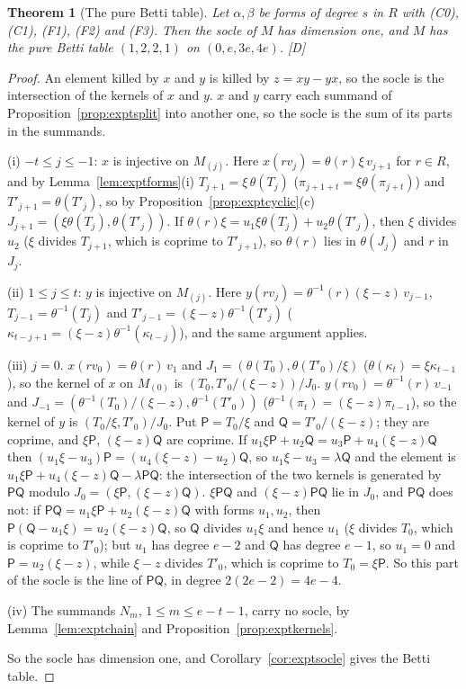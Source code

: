 \documentclass[11pt]{article}
\newtheorem{thmletter}{Theorem}
\theoremstyle{definition}
\theoremstyle{remark}
\begin{document}
\begin{thmletter}[The pure Betti table]\label{thm:exptpure}
Let $\alpha,\beta$ be forms of degree $s$ in $R$ with (C0), (C1), (F1), (F2) and (F3). Then the socle of $M$ has dimension one, and $M$ has the pure Betti table $(1,2,2,1)$ on $(0,e,3e,4e)$. [D]
\end{thmletter}
\begin{proof}
An element killed by $x$ and $y$ is killed by $z=xy-yx$, so the socle is the intersection of the kernels of $x$ and $y$. $x$ and $y$ carry each summand of Proposition~\ref{prop:exptsplit} into another one, so the socle is the sum of its parts in the summands.

(i) $-t\le j\le-1$: $x$ is injective on $M_{(j)}$. Here $x(rv_j)=\theta(r)\xi\,v_{j+1}$ for $r\in R$, and by Lemma~\ref{lem:exptforms}(i) $T_{j+1}=\xi\,\theta(T_j)$ ($\pi_{j+1+t}=\xi\theta(\pi_{j+t})$) and $T'_{j+1}=\theta(T'_j)$, so by Proposition~\ref{prop:exptcyclic}(c) $J_{j+1}=(\xi\theta(T_j),\theta(T'_j))$. If $\theta(r)\xi=u_1\xi\theta(T_j)+u_2\theta(T'_j)$, then $\xi$ divides $u_2$ ($\xi$ divides $T_{j+1}$, which is coprime to $T'_{j+1}$), so $\theta(r)$ lies in $\theta(J_j)$ and $r$ in $J_j$.

(ii) $1\le j\le t$: $y$ is injective on $M_{(j)}$. Here $y(rv_j)=\theta^{-1}(r)(\xi-z)\,v_{j-1}$, $T_{j-1}=\theta^{-1}(T_j)$ and $T'_{j-1}=(\xi-z)\theta^{-1}(T'_j)$ ($\kappa_{t-j+1}=(\xi-z)\theta^{-1}(\kappa_{t-j})$), and the same argument applies.

(iii) $j=0$. $x(rv_0)=\theta(r)\,v_1$ and $J_1=(\theta(T_0),\theta(T'_0)/\xi)$ ($\theta(\kappa_t)=\xi\kappa_{t-1}$), so the kernel of $x$ on $M_{(0)}$ is $(T_0,T'_0/(\xi-z))/J_0$. $y(rv_0)=\theta^{-1}(r)\,v_{-1}$ and $J_{-1}=(\theta^{-1}(T_0)/(\xi-z),\theta^{-1}(T'_0))$ ($\theta^{-1}(\pi_t)=(\xi-z)\pi_{t-1}$), so the kernel of $y$ is $(T_0/\xi,T'_0)/J_0$. Put $\mathsf P=T_0/\xi$ and $\mathsf Q=T'_0/(\xi-z)$; they are coprime, and $\xi\mathsf P$, $(\xi-z)\mathsf Q$ are coprime. If $u_1\xi\mathsf P+u_2\mathsf Q=u_3\mathsf P+u_4(\xi-z)\mathsf Q$ then $(u_1\xi-u_3)\mathsf P=(u_4(\xi-z)-u_2)\mathsf Q$, so $u_1\xi-u_3=\lambda\mathsf Q$ and the element is $u_1\xi\mathsf P+u_4(\xi-z)\mathsf Q-\lambda\mathsf P\mathsf Q$: the intersection of the two kernels is generated by $\mathsf P\mathsf Q$ modulo $J_0=(\xi\mathsf P,(\xi-z)\mathsf Q)$. $\xi\mathsf P\mathsf Q$ and $(\xi-z)\mathsf P\mathsf Q$ lie in $J_0$, and $\mathsf P\mathsf Q$ does not: if $\mathsf P\mathsf Q=u_1\xi\mathsf P+u_2(\xi-z)\mathsf Q$ with forms $u_1,u_2$, then $\mathsf P(\mathsf Q-u_1\xi)=u_2(\xi-z)\mathsf Q$, so $\mathsf Q$ divides $u_1\xi$ and hence $u_1$ ($\xi$ divides $T_0$, which is coprime to $T'_0$); but $u_1$ has degree $e-2$ and $\mathsf Q$ has degree $e-1$, so $u_1=0$ and $\mathsf P=u_2(\xi-z)$, while $\xi-z$ divides $T'_0$, which is coprime to $T_0=\xi\mathsf P$. So this part of the socle is the line of $\mathsf P\mathsf Q$, in degree $2(2e-2)=4e-4$.

(iv) The summands $N_m$, $1\le m\le e-t-1$, carry no socle, by Lemma~\ref{lem:exptchain} and Proposition~\ref{prop:exptkernels}.

So the socle has dimension one, and Corollary~\ref{cor:exptsocle} gives the Betti table.
\end{proof}
\end{document}
